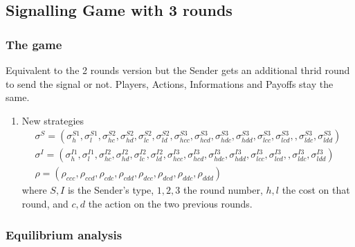\documentclass[11pt]{article}
\theoremstyle{plainCl1}
\begin{document}
\subsection{Signalling Game with 3 rounds}
\subsubsection{The game}

Equivalent to the 2 rounds version but the Sender gets an additional thrid round to send the signal or not. Players, Actions, Informations and Payoffs stay the same. 

\begin{enumerate}[label={(\alph*)}]
\item New strategies
	\begin{equation}\label{strategies3}
	\begin{array}{l}	
	\sigma^S = (\sigma^{S1}_h, \sigma^{S1}_l, \sigma^{S2}_{hc}, \sigma^{S2}_{hd}, \sigma^{S2}_{lc}, \sigma^{S2}_{ld}, 
	\sigma^{S3}_{hcc}, \sigma^{S3}_{hcd}, \sigma^{S3}_{hdc}, \sigma^{S3}_{hdd}, \sigma^{S3}_{lcc}, \sigma^{S3}_{lcd}, , \sigma^{S3}_{ldc}, \sigma^{S3}_{ldd})\\
	\sigma^I = (\sigma^{I1}_h, \sigma^{I1}_l, \sigma^{I2}_{hc}, \sigma^{I2}_{hd}, \sigma^{I2}_{lc}, \sigma^{I2}_{ld}, 
	\sigma^{I3}_{hcc}, \sigma^{I3}_{hcd}, \sigma^{I3}_{hdc}, \sigma^{I3}_{hdd}, \sigma^{I3}_{lcc}, \sigma^{I3}_{lcd}, , \sigma^{I3}_{ldc}, \sigma^{I3}_{ldd})\\
	\rho = (\rho_{ccc}, \rho_{ccd}, \rho_{cdc}, \rho_{cdd}, \rho_{dcc}, \rho_{dcd}, \rho_{ddc}, \rho_{ddd})
	\end{array}
	\end{equation}
	where $S,I$ is the Sender's type, $1,2,3$ the round number, $h,l$ the cost on that round, and $c,d$ the action on the two previous rounds.
\end{enumerate}

\subsubsection{Equilibrium analysis}
\end{document}
